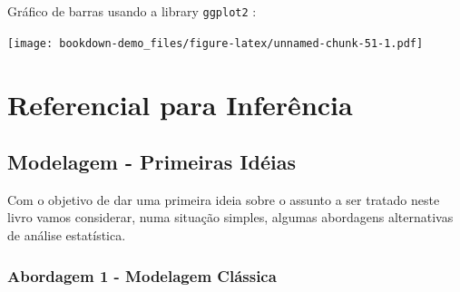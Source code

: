 \documentclass[]{book}
\newenvironment{Shaded}{\begin{snugshade}}{\end{snugshade}}
\newcommand{\KeywordTok}[1]{\textcolor[rgb]{0.13,0.29,0.53}{\textbf{{#1}}}}
\newcommand{\DataTypeTok}[1]{\textcolor[rgb]{0.13,0.29,0.53}{{#1}}}
\newcommand{\DecValTok}[1]{\textcolor[rgb]{0.00,0.00,0.81}{{#1}}}
\newcommand{\StringTok}[1]{\textcolor[rgb]{0.31,0.60,0.02}{{#1}}}
\newcommand{\NormalTok}[1]{{#1}}
\numberwithin{example}{chapter}
\numberwithin{remark}{chapter}
\numberwithin{definition}{chapter}
\begin{document}
Gráfico de barras usando a library \texttt{ggplot2} \citep{R-ggplot2}:

\begin{Shaded}
\end{Shaded}

\texttt{[image: bookdown-demo\_files/figure-latex/unnamed-chunk-51-1.pdf]}

\chapter{Referencial para Inferência}\label{refinf}

\section{Modelagem - Primeiras Idéias}\label{classic}

Com o objetivo de dar uma primeira ideia sobre o assunto a ser tratado
neste livro vamos considerar, numa situação simples, algumas abordagens
alternativas de análise estatística.

\subsection{Abordagem 1 - Modelagem
Clássica}\label{abordagem-1---modelagem-classica}
\end{document}
